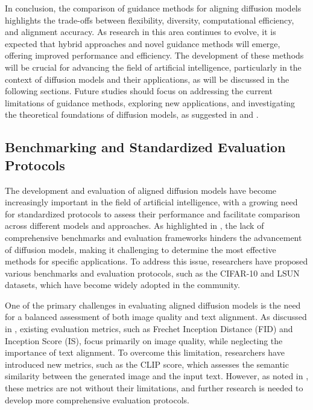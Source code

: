 \documentclass[11pt,a4paper]{article}
\begin{document}
In conclusion, the comparison of guidance methods for aligning diffusion models highlights the trade-offs between flexibility, diversity, computational efficiency, and alignment accuracy. As research in this area continues to evolve, it is expected that hybrid approaches and novel guidance methods will emerge, offering improved performance and efficiency. The development of these methods will be crucial for advancing the field of artificial intelligence, particularly in the context of diffusion models and their applications, as will be discussed in the following sections. Future studies should focus on addressing the current limitations of guidance methods, exploring new applications, and investigating the theoretical foundations of diffusion models, as suggested in \cite{arxiv:2208.11970} and \cite{arxiv:2410.02543}.


\subsection{Benchmarking and Standardized Evaluation Protocols}


The development and evaluation of aligned diffusion models have become increasingly important in the field of artificial intelligence, with a growing need for standardized protocols to assess their performance and facilitate comparison across different models and approaches. As highlighted in \cite{doi:10.1145/3626235}, the lack of comprehensive benchmarks and evaluation frameworks hinders the advancement of diffusion models, making it challenging to determine the most effective methods for specific applications. To address this issue, researchers have proposed various benchmarks and evaluation protocols, such as the CIFAR-10 and LSUN datasets, which have become widely adopted in the community.

One of the primary challenges in evaluating aligned diffusion models is the need for a balanced assessment of both image quality and text alignment. As discussed in \cite{arxiv:2207.12598}, existing evaluation metrics, such as Frechet Inception Distance (FID) and Inception Score (IS), focus primarily on image quality, while neglecting the importance of text alignment. To overcome this limitation, researchers have introduced new metrics, such as the CLIP score, which assesses the semantic similarity between the generated image and the input text. However, as noted in \cite{doi:10.1109/cvpr52729.2023.02154}, these metrics are not without their limitations, and further research is needed to develop more comprehensive evaluation protocols.
\end{document}
